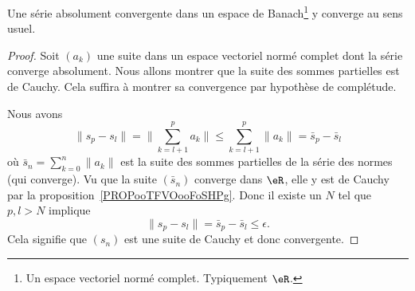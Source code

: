 \begin{proposition} \label{PropAKCusNM}
	Une série absolument convergente dans un espace de Banach\footnote{Un espace vectoriel normé complet. Typiquement \( \eR\).} y converge au sens usuel.
\end{proposition}

\begin{proof}
	Soit \( (a_k)\) une suite dans un espace vectoriel normé complet dont la série converge absolument. Nous allons montrer que la suite des sommes partielles est de Cauchy. Cela suffira à montrer sa convergence par hypothèse de complétude.

	Nous avons
	\begin{equation}
		\| s_p-s_l \|=\| \sum_{k=l+1}^{p}a_k\|  \leq\sum_{k=l+1}^p\| a_k \|=\bar s_p-\bar s_l
	\end{equation}
	où \( \bar s_n=\sum_{k=0}^n \| a_k \|\) est la suite des sommes partielles de la série des normes (qui converge). Vu que la suite \( (\bar s_n)\) converge dans \( \eR\), elle y est de Cauchy par la proposition~\ref{PROPooTFVOooFoSHPg}. Donc il existe un \( N\) tel que \( p,l>N\) implique
	\begin{equation}
		\| s_p-s_l \|=\bar s_p-\bar s_l\leq \epsilon.
	\end{equation}
	Cela signifie que \( (s_n)\) est une suite de Cauchy et donc convergente.
\end{proof}

